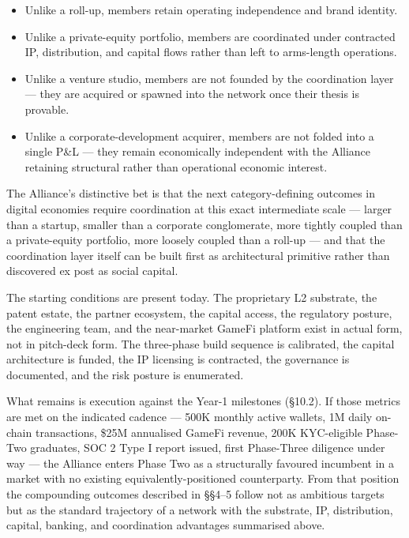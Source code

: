 \begin{itemize}[leftmargin=2em,itemsep=0.1em]
\item Unlike a roll-up, members retain operating independence and
brand identity.
\item Unlike a private-equity portfolio, members are coordinated under
contracted IP, distribution, and capital flows rather than left to
arms-length operations.
\item Unlike a venture studio, members are not founded by the
coordination layer --- they are acquired or spawned into the network
once their thesis is provable.
\item Unlike a corporate-development acquirer, members are not folded
into a single P\&L --- they remain economically independent with the
Alliance retaining structural rather than operational economic
interest.
\end{itemize}

The Alliance's distinctive bet is that the next category-defining
outcomes in digital economies require coordination at this exact
intermediate scale --- larger than a startup, smaller than a corporate
conglomerate, more tightly coupled than a private-equity portfolio,
more loosely coupled than a roll-up --- and that the coordination layer
itself can be built first as architectural primitive rather than
discovered ex post as social capital.

The starting conditions are present today. The proprietary L2
substrate, the patent estate, the partner ecosystem, the capital
access, the regulatory posture, the engineering team, and the
near-market GameFi platform exist in actual form, not in pitch-deck
form. The three-phase build sequence is calibrated, the capital
architecture is funded, the IP licensing is contracted, the
governance is documented, and the risk posture is enumerated.

What remains is execution against the Year-1 milestones (\S 10.2). If
those metrics are met on the indicated cadence --- 500K monthly active
wallets, 1M daily on-chain transactions, \$25M annualised GameFi
revenue, 200K KYC-eligible Phase-Two graduates, SOC 2 Type I report
issued, first Phase-Three diligence under way --- the Alliance enters
Phase Two as a structurally favoured incumbent in a market with no
existing equivalently-positioned counterparty. From that position the
compounding outcomes described in \S\S 4--5 follow not as ambitious
targets but as the standard trajectory of a network with the
substrate, IP, distribution, capital, banking, and coordination
advantages summarised above.

